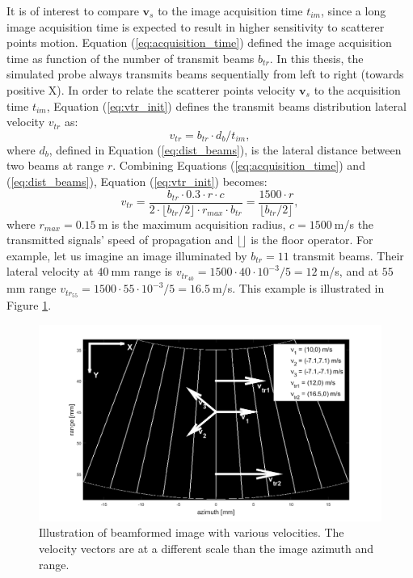 It is of interest to compare $\boldsymbol{v}_s$ to the image acquisition time $t_{im}$, since a long image acquisition time is expected to result in higher sensitivity to scatterer points motion.
Equation (\ref{eq:acquisition_time}) defined the image acquisition time as function of the number of transmit beams $b_{tr}$. 
In this thesis, the simulated probe always transmits beams sequentially from left to right (towards positive X). 
In order to relate the scatterer points velocity $\boldsymbol{v}_s$ to the acquisition time $t_{im}$, Equation (\ref{eq:vtr_init}) defines the transmit beams distribution lateral velocity $v_{tr}$ as:
\begin{equation}
    v_{tr} = b_{tr} \cdot d_b / t_{im},
\label{eq:vtr_init}
\end{equation}
\noindent
where $d_b$, defined in Equation (\ref{eq:dist_beams}), is the lateral distance between two beams at range $r$. Combining Equations (\ref{eq:acquisition_time}) and (\ref{eq:dist_beams}), Equation (\ref{eq:vtr_init}) becomes:
\begin{equation}
    v_{tr} = \frac{b_{tr} \cdot 0.3 \cdot r \cdot c}{2 \cdot \lfloor b_{tr} / 2 \rfloor \cdot r_{max} \cdot b_{tr}} = \frac{1500 \cdot r}{\lfloor b_{tr} / 2 \rfloor},
\label{eq:vtr}
\end{equation}
where $r_{max} = 0.15~$m is the maximum acquisition radius, $c = 1500~$m/s the transmitted signals' speed of propagation and $\lfloor \rfloor$ is the floor operator. 
For example, let us imagine an image illuminated by $b_{tr} = 11$ transmit beams. Their lateral velocity at $40~$mm range is $v_{tr_{40}} = 1500 \cdot 40 \cdot 10^{-3} / 5 = 12~$m/s, and at $55~$mm range $v_{tr_{55}} = 1500 \cdot 55 \cdot 10^{-3} / 5 = 16.5~$m/s. This example is illustrated in Figure \ref{fig:velocities}.
\begin{figure}[ht]
    \centering
    \includegraphics[width=\linewidth]{./images/results/2.1/velocities.png}
    \caption{Illustration of beamformed image with various velocities. The velocity vectors are at a different scale than the image azimuth and range.}
    \label{fig:velocities}
\end{figure}

